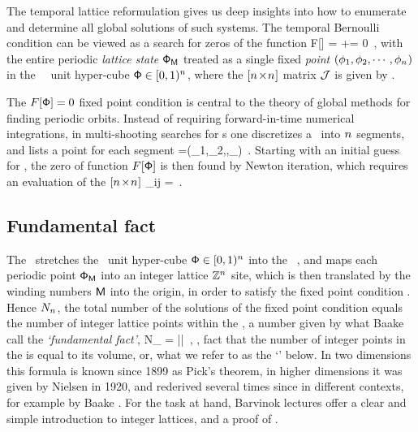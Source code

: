 The {temporal lattice} reformulation gives us deep insights into how to
enumerate and determine all global solutions of such systems.
The {temporal Bernoulli} condition
 can be viewed as a search for zeros of the function
\beq
F[\Xx] = \jMorb\Xx+\Mm = 0
\,,
with the entire periodic \emph{lattice state} ${\mathsf{\Phi}}_{\mathsf{M}}$ treated as a
single fixed \emph{point} $(\phi_1,\phi_{2},\cdots,\phi_{{n_{}}})$ in the
\cl{}\dmn\ \statesp\ unit hyper-cube $\mathsf{\Phi}\in[0,1)^{n_{}}$, where
the $[{n_{}}\!\times\!{n_{}}]$ matrix ${\mathcal{J}}$ is given by .

The
$F[\mathsf{\Phi}]=0$ fixed point condition  is central to the
theory of {global methods} for finding periodic orbits. Instead of
requiring forward-in-time numerical integrations, in multi-shooting
searches for \po s one discretizes a \po\ into ${n_{}}$
segments,
and lists a point for each segment
\beq
\transp{\Xx}=(\ssp_1,\ssp_2,\cdots,\ssp_\cl{})
\,.
Starting with an initial guess for \Xx, the zero of function
$F[\mathsf{\Phi}]$ is then found by Newton iteration, which requires
an evaluation of the $[{n_{}}\!\times\!{n_{}}]$ \emph{\jacobianOrb}
\beq
\jMorb_{ij} =
\,.

\subsection{Fundamental fact} %
\label{s:bernIntLat}

The {\jacobianOrb} \jMorb\ stretches the \statesp\ unit hyper-cube
$\mathsf{\Phi}\in[0,1)^{n_{}}$ into the \cl{}\dmn\ {\em \fundPip}, and maps each
periodic point ${\mathsf{\Phi}}_{\mathsf{M}}$ into an integer lattice $\mathbb{Z}^{n_{}}$
site, which is then translated by the winding numbers $\mathsf{M}$ into the
origin, in order to satisfy the fixed point condition
. Hence $N_{n_{}}$, the total number of the solutions
of the fixed point condition equals the number of integer lattice points
within the {\fundPip}, a number given by what Baake \etal{}
call the \emph{`fundamental fact'},
\beq
N_\cl{} = |\Det\jMorb|
\,,
\ie, fact that the number of integer points in the {\fundPip} is equal to
its volume, or, what we refer to as the `{\HillDet}' below. In two
dimensions this formula is known since 1899 as
 {Pick's theorem},
in higher dimensions it was given by Nielsen in
1920, and rederived several times since in different contexts, for
example by Baake \etal{}. For the task at hand,
Barvinok
 {lectures}
offer a clear and simple introduction to integer lattices, and a proof of
.

